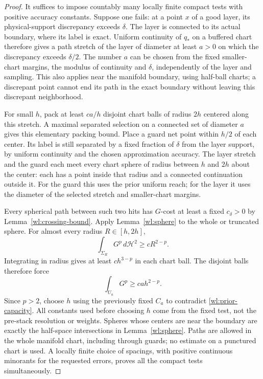 \documentclass[11pt]{article}
\numberwithin{equation}{section}
\theoremstyle{definition}
\theoremstyle{remark}
\begin{document}
\begin{proof}
It suffices to impose countably many locally finite compact tests
with positive accuracy constants.  Suppose one fails: at a point
$x$ of a good layer, its physical-support discrepancy exceeds
$\delta$.  The layer is connected to its actual boundary, where its
label is exact.  Uniform continuity of $q_*$ on a buffered chart
therefore gives a path stretch of the layer of diameter at least
$a>0$ on which the discrepancy exceeds $\delta/2$.  The number $a$
can be chosen from the fixed smaller-chart margins, the modulus of
continuity and $\delta$, independently of the layer and sampling.
This also applies near the manifold boundary, using half-ball
charts; a discrepant point cannot end its path in the exact boundary
without leaving this discrepant neighborhood.

For small $h$, pack at least $c a/h$ disjoint chart balls of radius
$2h$ centered along this stretch.  A maximal separated selection on a
connected set of diameter $a$ gives this elementary packing bound.
Place a guard net point within $h/2$ of each center.  Its label is
still separated by a fixed fraction of $\delta$ from the layer
support, by uniform continuity and the chosen approximation
accuracy.  The layer stretch and the guard each meet every chart
sphere of radius between $h$ and $2h$ about the center: each has a
point inside that radius and a connected continuation outside it.
For the guard this uses the prior uniform reach; for the layer it
uses the diameter of the selected stretch and smaller-chart
margins.

Every spherical path between such two hits has $G$-cost at least a
fixed $c_\delta>0$ by Lemma~\ref{wl:crossing-bound}.  Apply
Lemma~\ref{wl:sphere} to the whole or truncated sphere.  For almost
every radius $R\in[h,2h]$,
\[
 \int_{\Sigma_R}G^p\,d\mathcal H^2\geq cR^{2-p}.
\]
Integrating in radius gives at least $c h^{3-p}$ in each chart ball.
The disjoint balls therefore force
\begin{equation}\label{wl:barrier-divergence}
 \int_{U_a}G^p\geq c a h^{2-p}.
\end{equation}
Since $p>2$, choose $h$ using the previously fixed $C_a$ to contradict
\eqref{wl:prior-capacity}.  All constants used before choosing $h$
come from the fixed test, not the pre-stack resolution or weights.
Spheres whose centers are near the boundary are exactly the
half-space intersections in Lemma~\ref{wl:sphere}.  Paths are allowed
in the whole manifold chart, including through guards; no estimate
on a punctured chart is used.  A locally finite choice of spacings,
with positive continuous minorants for the requested errors, proves
all the compact tests simultaneously.
\end{proof}
\end{document}
